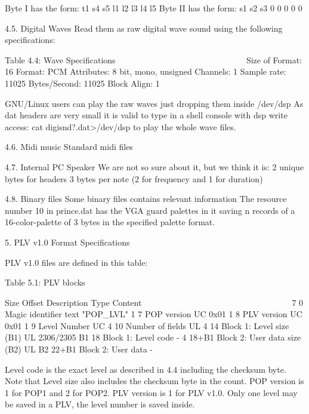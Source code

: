  Byte I  has the form: t1 s4 s5 l1 l2 l3 l4 l5
 Byte II has the form: s1 s2 s3  0  0  0  0  0

4.5. Digital Waves
 Read them as raw digital wave sound using the following specifications:

                   Table 4.4: Wave Specifications
                   ~~~~~~~~~~~~~~~~~~~~~~~~~~~~~~
  Size of Format: 16
  Format:         PCM
  Attributes:     8 bit, mono, unsigned
  Channels:       1
  Sample rate:    11025
  Bytes/Second:   11025
  Block Align:    1

 GNU/Linux users can play the raw waves just dropping them inside /dev/dsp
 As dat headers are very small it is valid to type in a shell console with
 dsp write access: cat digisnd?.dat>/dev/dsp to play the whole wave files.

4.6. Midi music
 Standard midi files

4.7. Internal PC Speaker
 We are not so sure about it, but we think it is:
  2 unique bytes for headers
  3 bytes per note (2 for frequency and 1 for duration)

4.8. Binary files
 Some binary files contains relevant information
 The resource number 10 in prince.dat has the VGA guard palettes in it
 saving n records of a 16-color-palette of 3 bytes in the specified palette
 format.


5. PLV v1.0 Format Specifications
   ~~~ ~~~~ ~~~~~~ ~~~~~~~~~~~~~~

 PLV v1.0 files are defined in this table:

                   Table 5.1: PLV blocks
                   ~~~~~~~~~~~~~~~~~~~~~

   Size Offset Description                  Type   Content
   ~~~~ ~~~~~~ ~~~~~~~~~~~                  ~~~~   ~~~~~~~
      7      0 Magic identifier             text   "POP_LVL"
      1      7 POP version                  UC     0x01
      1      8 PLV version                  UC     0x01
      1      9 Level Number                 UC
      4     10 Number of fields             UL
      4     14 Block 1: Level size (B1)     UL     2306/2305
     B1     18 Block 1: Level code          -
      4  18+B1 Block 2: User data size (B2) UL
     B2  22+B1 Block 2: User data           -

 Level code is the exact level as described in 4.4 including the checksum
 byte. Note that Level size also includes the checksum byte in the count.
 POP version is 1 for POP1 and 2 for POP2.
 PLV version is 1 for PLV v1.0.
 Only one level may be saved in a PLV, the level number is saved inside.

